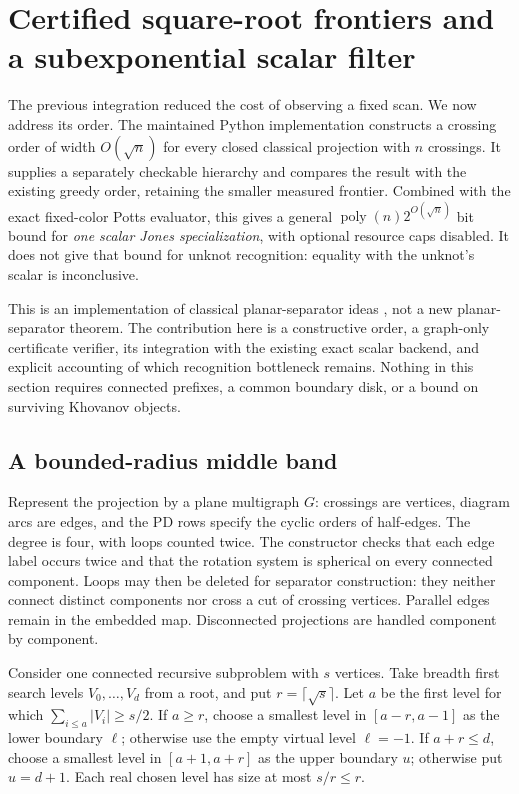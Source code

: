 \section{Certified square-root frontiers and a subexponential scalar filter}
\label{sec:separator-orders}

The previous integration reduced the cost of observing a fixed scan.  We now
address its order.  The maintained Python implementation constructs a crossing
order of width $O(\sqrt n)$ for every closed classical projection with $n$
crossings.  It supplies a separately checkable hierarchy and compares the
result with the existing greedy order, retaining the smaller measured frontier.
Combined with the exact fixed-color Potts evaluator, this gives a general
$\operatorname{poly}(n)2^{O(\sqrt n)}$ bit bound for \emph{one scalar Jones
specialization}, with optional resource caps disabled.  It does not give that
bound for unknot recognition: equality with the unknot's scalar is inconclusive.

This is an implementation of classical planar-separator ideas
\cite{lipton-tarjan}, not a new planar-separator theorem.  The contribution here
is a constructive order, a graph-only certificate verifier, its integration
with the existing exact scalar backend, and explicit accounting of which
recognition bottleneck remains.  Nothing in this section requires connected
prefixes, a common boundary disk, or a bound on surviving Khovanov objects.

\subsection{A bounded-radius middle band}

Represent the projection by a plane multigraph $G$: crossings are vertices,
diagram arcs are edges, and the PD rows specify the cyclic orders of half-edges.
The degree is four, with loops counted twice.  The constructor checks that each
edge label occurs twice and that the rotation system is spherical on every
connected component.  Loops may then be deleted for separator construction:
they neither connect distinct components nor cross a cut of crossing vertices.
Parallel edges remain in the embedded map.  Disconnected projections are
handled component by component.

Consider one connected recursive subproblem with $s$ vertices.  Take breadth
first search levels $V_0,\ldots,V_d$ from a root, and put
$r=\lceil\sqrt{s}\rceil$.  Let $a$ be the first level for which
$\sum_{i\le a}|V_i|\ge s/2$.  If $a\ge r$, choose a smallest level in
$[a-r,a-1]$ as the lower boundary $\ell$; otherwise use the empty virtual
level $\ell=-1$.  If $a+r\le d$, choose a smallest level in
$[a+1,a+r]$ as the upper boundary $u$; otherwise put $u=d+1$.
Each real chosen level has size at most $s/r\le r$.

